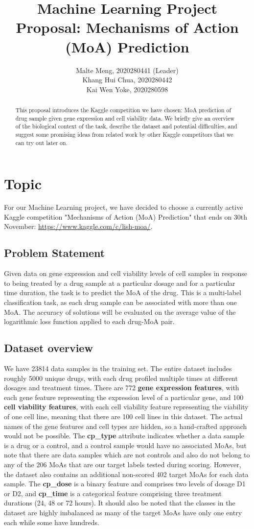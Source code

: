 \documentclass{article}
\title{Machine Learning Project Proposal: Mechanisms of Action (MoA) Prediction}
\author{
    Malte Meng, 2020280441 (Leader) \\
    \AND 
    Khang Hui Chua, 2020280442 \\
    \AND
    Kai Wen Yoke, 2020280598
}
\begin{document}
\maketitle
\begin{abstract}
This proposal introduces the Kaggle competition we have chosen: MoA prediction of drug sample given gene expression and cell viability data. We briefly give an overview of the biological context of the task, describe the dataset and potential difficulties, and suggest some promising ideas from related work by other Kaggle competitors that we can try out later on.
\end{abstract}

\section{Topic}
For our Machine Learning project, we have decided to choose a currently active Kaggle competition "Mechanisms of Action (MoA) Prediction" that ends on 30th November: \url{https://www.kaggle.com/c/lish-moa/}. 

\subsection{Problem Statement}
Given data on gene expression and cell viability levels of cell samples in response to being treated by a drug sample at a particular dosage and for a particular time duration, the task is to predict the MoA of the drug. This is a multi-label classification task, as each drug sample can be associated with more than one MoA. The accuracy of solutions will be evaluated on the average value of the logarithmic loss function applied to each drug-MoA pair.

\subsection{Dataset overview}
We have 23814 data samples in the training set. The entire dataset includes roughly 5000 unique drugs, with each drug profiled multiple times at different dosages and treatment times. There are 772 \textbf{gene expression features}, with each gene feature representing the expression level of a particular gene, and 100 \textbf{cell viability features}, with each cell viability feature representing the viability of one cell line, meaning that there are 100 cell lines in this dataset. The actual names of the gene features and cell types are hidden, so a hand-crafted approach would not be possible. The \textbf{cp\_type} attribute indicates whether a data sample is a drug or a control, and a control sample would have no associated MoAs, but note that there are data samples which are not controls and also do not belong to any of the 206 MoAs that are our target labels tested during scoring. However, the dataset also contains an additional non-scored 402 target MoAs for each data sample. The \textbf{cp\_dose} is a binary feature and comprises two levels of dosage D1 or D2, and \textbf{cp\_time} is a categorical feature comprising three treatment durations (24, 48 or 72 hours). It should also be noted that the classes in the dataset are highly imbalanced as many of the target MoAs have only one entry each while some have hundreds.
\end{document}
